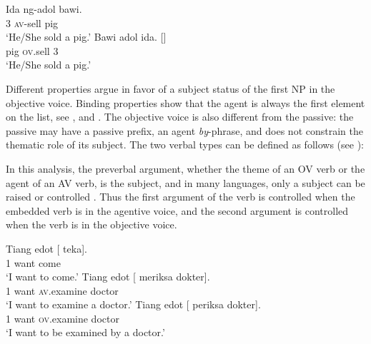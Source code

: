 \documentclass[output=paper
	        ,collection
	        ,collectionchapter
 	        ,biblatex
                ,babelshorthands
                ,newtxmath
                ,draftmode
                ,colorlinks, citecolor=brown
]{langscibook}
\begin{document}
\eal
\ex  
\gll Ida ng-adol bawi.\\
     3\SG{} \textsc{av}-sell pig\\
\glt `He/She sold a pig.'
\ex 
\gll Bawi adol ida. []\\
     pig \textsc{ov}.sell 3\SG \\
\glt `He/She sold a pig.' 
\zl

Different properties argue in favor of a subject status of the first NP in the objective voice. Binding properties show that the agent is always the first element on the \argst list, see
,  and . The objective voice is also different from the passive: the passive may have a passive prefix, an agent \emph{by}-phrase, and does not constrain the thematic role of its subject. The two verbal types can be defined as follows (see ):

\begin{exe}       
\ex {} \impl
{}
\ex {} \impl
{}
\end{exe}

In this analysis, the preverbal argument, whether the theme of an OV verb or the agent of an AV verb, is the subject, and in many languages, only a subject
can be raised or controlled \citep{Zaenenetal1985}. Thus the first argument of the verb is controlled when the embedded verb is in the agentive voice, and the second argument is controlled when the verb is in the objective voice. 


\begin{exe}
\ex \begin{xlist}
\ex 
\gll Tiang edot [ \trace{} teka].\\
     1 want     {} {} come\\\hfill\citep[ex 25]{WechslerandArka1998}
\glt `I want to come.'
\ex 
\gll Tiang edot [ \trace{}  meriksa dokter].\\
     1     want {} {}     \textsc{av}.examine doctor\\
\glt `I want to examine a doctor.'
\ex 
\gll Tiang edot [ \trace{} periksa dokter].\\
     1     want {} {}    \textsc{ov}.examine doctor\\
\glt `I want to be examined by a doctor.'
\end{xlist}
\end{exe}
\end{document}
